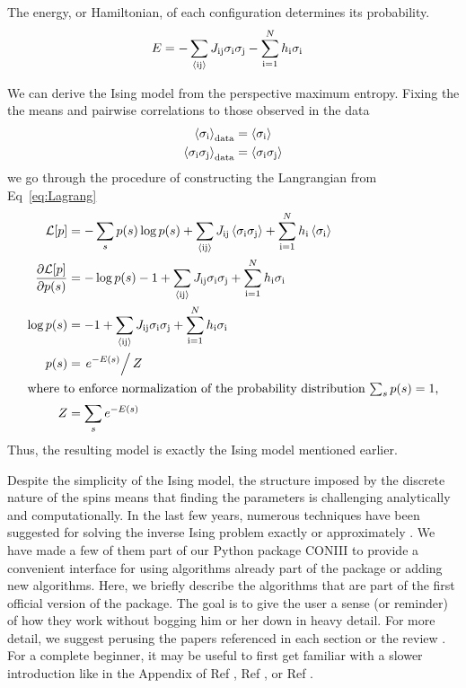\documentclass[aps,prl,twocolumn,nofootinbib]{revtex4-1}
\begin{document}
The energy, or Hamiltonian, of each configuration determines its probability.
\begin{align}
	E &= -\sum_{\rm \left<ij\right>} J_{\rm ij}\sigma_{\rm i}\sigma_{\rm j} -\sum_{\rm i=1}^Nh_{\rm i}\sigma_{\rm i}
\end{align}

We can derive the Ising model from the perspective maximum entropy. Fixing the the means and pairwise correlations to those observed in the data
\begin{align}
	\left<\sigma_{\rm i}\right>_{\rm data} &= \left<\sigma_{\rm i}\right>\\
	\left<\sigma_{\rm i}\sigma_{\rm j}\right>_{\rm data} &= \left<\sigma_{\rm i}\sigma_{\rm j}\right>
\end{align}
we go through the procedure of constructing the Langrangian from Eq~\ref{eq:Lagrang}
\begin{align}
	\mathcal{L}[p] &= -\sum_s p(s)\log p(s) +\sum_{\rm \left<ij\right>} J_{\rm ij}\left<\sigma_{\rm i}\sigma_{\rm j}\right> +\sum_{\rm i=1}^Nh_{\rm i}\left<\sigma_{\rm i}\right>\\
	\frac{\partial\mathcal{L}[p]}{\partial p(s)} &= -\log p(s)-1 +\sum_{\rm \left<ij\right>} J_{\rm ij}\sigma_{\rm i}\sigma_{\rm j} +\sum_{\rm i=1}^Nh_{\rm i}\sigma_{\rm i}\\
	\log p(s) &= -1 +\sum_{\rm \left<ij\right>} J_{\rm ij}\sigma_{\rm i}\sigma_{\rm j} +\sum_{\rm i=1}^Nh_{\rm i}\sigma_{\rm i}\\
	p(s) &= \left.e^{-E(s)}\right/Z\\
\intertext{where to enforce normalization of the probability distribution $\sum_s p(s) = 1$,}
	Z &= \sum_s e^{-E(s)}
\end{align}
Thus, the resulting model is exactly the Ising model mentioned earlier.

Despite the simplicity of the Ising model, the structure imposed by the discrete nature of the spins means that finding the parameters is challenging analytically and computationally. In the last few years, numerous techniques have been suggested for solving the inverse Ising problem exactly or approximately \cite{Nguyen:2017ww}. We have made a few of them part of our Python package CONIII to provide a convenient interface for using algorithms already part of the package or adding new algorithms. Here, we briefly describe the algorithms that are part of the first official version of the package. The goal is to give the user a sense (or reminder) of how they work without bogging him or her down in heavy detail. For more detail, we suggest perusing the papers referenced in each section or the review \cite{Nguyen:2017ww}. For a complete beginner, it may be useful to first get familiar with a slower introduction like in the Appendix of Ref \cite{Lee:2015ev}, Ref \cite{Bialek:2012ueb}, or Ref \cite{Bretthorst:2003ua}.
\end{document}
